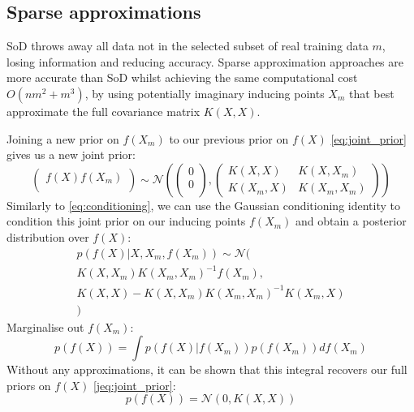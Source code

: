 \subsection{Sparse approximations \cite{big-data}}
SoD throws away all data not in the selected subset of real training data $m$, losing information and reducing accuracy. Sparse approximation approaches are more accurate than SoD whilst achieving the same computational cost $O(nm^2 + m^3)$, by using potentially imaginary inducing points $X_m$ that best approximate the full covariance matrix $K(X,X)$. 

Joining a new prior on $f(X_m)$ to our previous prior on $f(X)$ \ref{eq:joint_prior} gives us a new joint prior:
\begin{equation*}
    \begin{pmatrix}
        f(X)
        f(X_m) \\
    \end{pmatrix} \sim \mathcal{N} (
    \begin{pmatrix}
        0 \\
        0 \\
    \end{pmatrix},
    \begin{pmatrix}
        K(X, X) & K(X, X_m) \\
        K(X_m, X) & K(X_m, X_m)    
    \end{pmatrix}
    )
\end{equation*}
Similarly to \ref{eq:conditioning}, we can use the Gaussian conditioning identity to condition this joint prior on our inducing points $f(X_m)$ and obtain a posterior distribution over $f(X)$:
\begin{equation} \label{eq:conditioning_approx}
    \begin{aligned}
        p(f(X) | X, X_m, f(X_m)) \sim \mathcal{N} ( \\
        K(X, X_m) K(X_m, X_m)^{-1} f(X_m), \\
        K(X, X) - K(X, X_m) K(X_m, X_m)^{-1} K(X_m, X) \\
        )
    \end{aligned}
\end{equation}
Marginalise out $f(X_m)$:
\begin{equation*}
    p(f(X)) = \int p(f(X) | f(X_m)) p(f(X_m)) df(X_m)
\end{equation*}
Without any approximations, it can be shown \cite{big-data} that this integral recovers our full priors on $f(X)$ \ref{jeq:joint_prior}:
\begin{equation*}
    p(f(X)) = \mathcal{N}\left(0, K(X, X)\right)
\end{equation*}
